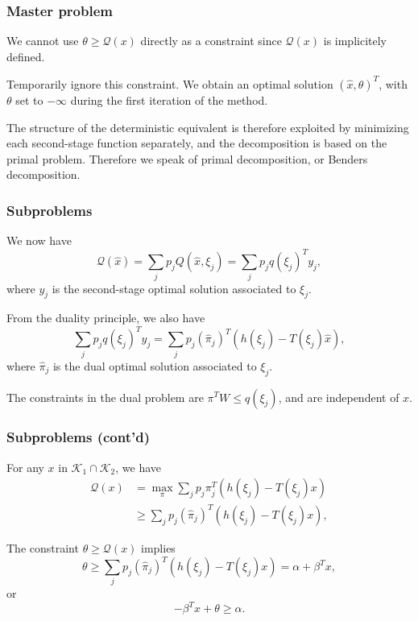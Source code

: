 \documentclass{beamer}
\def\cK{\mathcal{K}}
\begin{document}
\begin{frame}
\frametitle{Master problem}

We cannot use $\theta \geq \mathcal{Q}(x)$ directly as a constraint since $\mathcal{Q}(x)$ is implicitely defined.
	
\mbox{}
	
{\blue Temporarily ignore} this constraint.
We obtain an optimal solution $(\hat{x}, \theta)^T$, with $\theta$ set to $-\infty$ during the first iteration of the method.
	
\mbox{}

The structure of the deterministic equivalent is therefore exploited by minimizing each second-stage function separately, and the decomposition is based on the primal problem.
Therefore we speak of primal decomposition, or Benders decomposition.	
	
\end{frame}

\begin{frame}
\frametitle{Subproblems}
	
We now have
\[
\mathcal{Q}(\hat{x}) = \sum_j p_j Q(\hat{x}, \xi_j) = \sum_j p_jq(\xi_j)^Ty_j,
\]
where $y_j$ is the second-stage optimal solution associated to $\xi_j$.
	
\mbox{}

From the duality principle, we also have	
\[
\sum_j p_j q(\xi_j)^T y_j = \sum_j p_j (\hat{\pi}_j)^T(h(\xi_j) -
T(\xi_j)\hat{x}),
\]
where $\hat{\pi}_j$ is the dual optimal solution associated to $\xi_j$.
	
\mbox{}
	
The constraints in the dual problem are $\pi^T W \leq q(\xi_j)$, and are independent of $x$.
	
\end{frame}

\begin{frame}
\frametitle{Subproblems (cont'd)}
	
For any $x$ in $\cK_1 \cap \cK_2$, we have
\begin{align*}
\mathcal{Q}(x) &= \max_{\pi} \sum_j p_j \pi_j^T(h(\xi_j) - T(\xi_j)x) \\
& \geq \sum_j p_j(\hat{\pi}_j)^T(h(\xi_j) - T(\xi_j)x),
\end{align*}
	
\mbox{}
	
The constraint $\theta \geq \mathcal{Q}(x)$ implies
\[
\theta \geq \sum_j p_j(\hat{\pi}_j)^T(h(\xi_j) - T(\xi_j)x) = \alpha +
\beta^Tx,
\]
or
\[
-\beta^Tx + \theta \geq \alpha.
\]
	
\end{frame}
\end{document}
